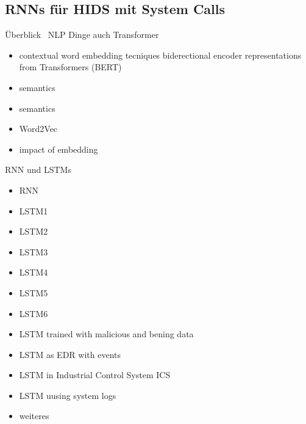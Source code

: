 \subsection{RNNs für HIDS mit System Calls}
    Überblick~\cite{NLPHIDSSWORNA2022}
    NLP Dinge auch Transformer
    \begin{itemize}
        \item contextual word embedding tecniques biderectional encoder representations from Transformers (BERT)~\cite{NLPBERT2018}
        \item semantics~\cite{SEMANTICSLAKSHMANAN2015}
        \item semantics~\cite{SEMANTICSCREECH2014}
        \item Word2Vec~\cite{W2VWUNDERLICH2019}
        \item impact of embedding~\cite{IMPACTOFEMBEDDINGWUNDERLICH2020}
    \end{itemize}
    RNN und LSTMs
    \begin{itemize}
        \item RNN~\cite{RNN/CNN}
        \item LSTM1~\cite{LSTMsys}
        \item LSTM2~\cite{LSTMSURATKAR2019} 
        \item LSTM3~\cite{NIU2020} 
        \item LSTM4~\cite{BIDIRECTIONALLSTMCHAWLA2019} 
        \item LSTM5~\cite{VARIATIONALLSTMBOUZAR2019} 
        \item LSTM6~\cite{RNNVEDBOUZAR2020} 
        \item LSTM trained with malicious and bening data~\cite{LSTMKIM2016} %
        \item LSTM as EDR with events~\cite{EVENTLSTMVASQUEZ2020}
        \item LSTM in Industrial Control System ICS~\cite{ICSLSTMFENG2017} %
        \item LSTM uusing system logs~\cite{LOGLSTMMIN2017} %
        
        \item weiteres
    \end{itemize}
